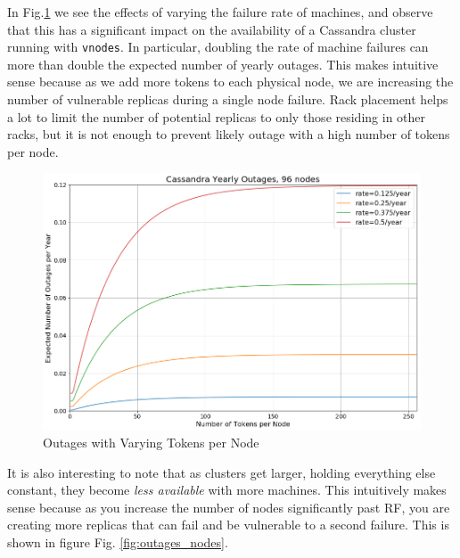 \documentclass{article}
\begin{document}
In Fig.\ref{fig:outages_all_vnodes} we see the effects of varying the failure rate of machines, and observe that this has a significant impact on the availability of a Cassandra cluster running with \texttt{vnodes}. In particular, doubling the rate of machine failures can more than double the expected number of yearly outages. This makes intuitive sense because as we add more tokens to each physical node, we are increasing the number of vulnerable replicas during a single node failure. Rack placement helps a lot to limit the number of potential replicas to only those residing in other racks, but it is not enough to prevent likely outage with a high number of tokens per node.
\begin{figure}[h!]
    \centering
    \includegraphics[width=1.0\textwidth]{images/outages_all_vnodes.png}
    \caption{Outages with Varying Tokens per Node}
    \label{fig:outages_all_vnodes}
\end{figure}

It is also interesting to note that as clusters get larger, holding everything else constant, they become \textit{less available} with more machines. This intuitively makes sense because as you increase the number of nodes significantly past RF, you are creating more replicas that can fail and be vulnerable to a second failure. This is shown in figure Fig. \ref{fig:outages_nodes}.
\end{document}
